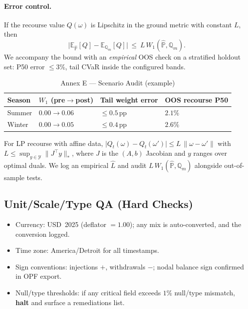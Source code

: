 \documentclass[11pt]{article}
\newcommand{\E}{\mathbb{E}}
\numberwithin{equation}{section}
\theoremstyle{definition}
\theoremstyle{remark}
\begin{document}
\paragraph{Error control.}
If the recourse value $Q(\omega)$ is Lipschitz in the ground metric with constant $L$, then
\[
\big| \E_{\widehat{\mathbb{P}}}[Q]-\E_{\mathbb{Q}_m}[Q]\big|\ \le\ L\,W_1(\widehat{\mathbb{P}},\mathbb{Q}_m).
\]
We accompany the bound with an \emph{empirical} OOS check on a stratified holdout set: P50 error $\le 3\%$, tail CVaR inside the configured bands.

\begin{table}[h]
\centering
\caption{Annex E — Scenario Audit (example)}
\label{tab:scenarioaudit}
\begin{tabular}{@{}llll@{}}
\toprule
\textbf{Season} & \textbf{$W_1$ (pre$\rightarrow$post)} & \textbf{Tail weight error} & \textbf{OOS recourse P50} \\
\midrule
Summer & $0.00 \rightarrow 0.06$ & $\le 0.5$\,pp & $2.1\%$ \\
Winter & $0.00 \rightarrow 0.05$ & $\le 0.4$\,pp & $2.6\%$ \\
\bottomrule
\end{tabular}
\end{table}

For LP recourse with affine data, $\lvert Q_t(\omega)-Q_t(\omega')\rvert \le L\,\|\omega-\omega'\|$ with
$L \le \sup_{y\in\mathcal{Y}}\|J^\top y\|_*$, where $J$ is the $(A,b)$ Jacobian and $y$ ranges over optimal duals.
We log an empirical $\widehat L$ and audit $L\,W_1(\widehat{\mathbb{P}},\mathbb{Q}_m)$ alongside out-of-sample tests.

\subsection{ Unit/Scale/Type QA (Hard Checks)}
\label{E7}
\begin{itemize}[leftmargin=1.2em]
  \item Currency: USD~2025 (deflator $=1.00$); any mix is auto-converted, and the conversion logged.
  \item Time zone: America/Detroit for all timestamps.
  \item Sign conventions: injections $+$, withdrawals $-$; nodal balance sign confirmed in OPF export.
  \item Null/type thresholds: if any critical field exceeds $1\%$ null/type mismatch, \textbf{halt} and surface a remediations list.
\end{itemize}
\end{document}
